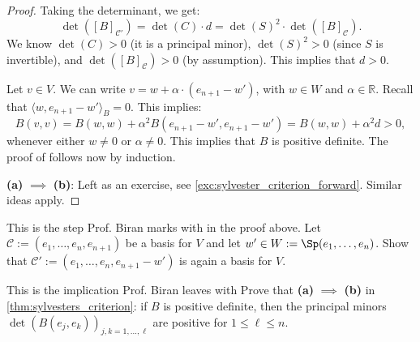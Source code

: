 \begin{proof}
Taking the determinant, we get:
\[
\det([B]_{\mathcal{C}'}) = \det(C) \cdot d = \det(S)^2 \cdot \det([B]_{\mathcal{C}}).
\]
We know $\det(C) > 0$ (it is a principal minor), $\det(S)^2 > 0$ (since $S$ is invertible), and $\det([B]_{\mathcal{C}}) > 0$ (by assumption).
This implies that $d > 0$.

Let $v \in V$. We can write $v = w + \alpha \cdot (e_{n+1} - w')$, with $w \in W$ and $\alpha \in \mathbb{R}$.
Recall that $\langle w, e_{n+1} - w' \rangle_B = 0$.
This implies:
\[
B(v, v) = B(w, w) + \alpha^2 B(e_{n+1} - w', e_{n+1} - w') = B(w, w) + \alpha^2 d > 0,
\]
whenever either $w \neq 0$ or $\alpha \neq 0$. This implies that $B$ is positive definite.
The proof of  follows now by induction.

\textbf{(a)} $\implies$ \textbf{(b)}: Left as an exercise, see \cref{exc:sylvester_criterion_forward}. Similar ideas apply.
\end{proof}

\begin{exercise}
\label{exc:shifted_family_is_basis}
This is the step Prof. Biran marks with  in the proof above. Let $\mathcal{C} := (e_1, \dots, e_n, e_{n+1})$ be a basis for $V$ and let $w' \in W := \Sp(e_1, \dots, e_n)$. Show that $\mathcal{C}' := (e_1, \dots, e_n, e_{n+1} - w')$ is again a basis for $V$.
\end{exercise}

\begin{exercise}
\label{exc:sylvester_criterion_forward}
This is the implication Prof. Biran leaves with  Prove that \textbf{(a)} $\implies$ \textbf{(b)} in \cref{thm:sylvesters_criterion}: if $B$ is positive definite, then the principal minors $\det(B(e_j, e_k))_{j,k = 1, \dots, \ell}$ are positive for $1 \le \ell \le n$.
\end{exercise}

